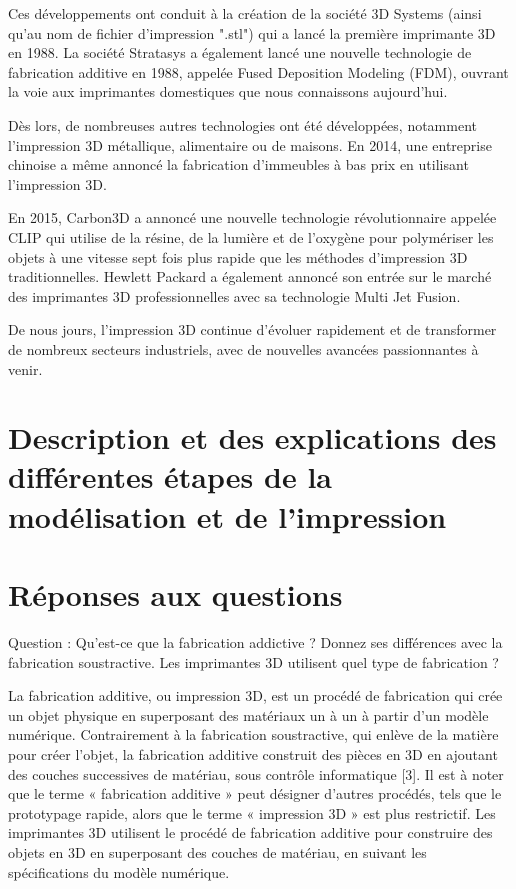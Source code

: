 \documentclass[12pt, letterpaper]{report}
\begin{document}
Ces développements ont conduit à la création de la société 3D Systems (ainsi qu'au nom de fichier d'impression ".stl") qui a lancé la première imprimante 3D en 1988. La société Stratasys a également lancé une nouvelle technologie de fabrication additive en 1988, appelée Fused Deposition Modeling (FDM), ouvrant la voie aux imprimantes domestiques que nous connaissons aujourd'hui.

Dès lors, de nombreuses autres technologies ont été développées, notamment l'impression 3D métallique, alimentaire ou de maisons. En 2014, une entreprise chinoise a même annoncé la fabrication d'immeubles à bas prix en utilisant l'impression 3D.

En 2015, Carbon3D a annoncé une nouvelle technologie révolutionnaire appelée CLIP qui utilise de la résine, de la lumière et de l'oxygène pour polymériser les objets à une vitesse sept fois plus rapide que les méthodes d'impression 3D traditionnelles. Hewlett Packard a également annoncé son entrée sur le marché des imprimantes 3D professionnelles avec sa technologie Multi Jet Fusion.

De nous jours, l'impression 3D continue d'évoluer rapidement et de transformer de nombreux secteurs industriels, avec de nouvelles avancées passionnantes à venir.

\chapter{Description et des explications des différentes étapes de la modélisation et de l’impression}



\chapter{Réponses aux questions}

Question : Qu’est-ce que la fabrication addictive ? Donnez ses différences avec la fabrication
soustractive. Les imprimantes 3D utilisent quel type de fabrication ?

La fabrication additive, ou impression 3D, est un procédé de fabrication qui crée un objet physique en superposant des matériaux un à un à partir d'un modèle numérique. Contrairement à la fabrication soustractive, qui enlève de la matière pour créer l'objet, la fabrication additive construit des pièces en 3D en ajoutant des couches successives de matériau, sous contrôle informatique [3]. Il est à noter que le terme « fabrication additive » peut désigner d'autres procédés, tels que le prototypage rapide, alors que le terme « impression 3D » est plus restrictif. Les imprimantes 3D utilisent le procédé de fabrication additive pour construire des objets en 3D en superposant des couches de matériau, en suivant les spécifications du modèle numérique.
\end{document}
